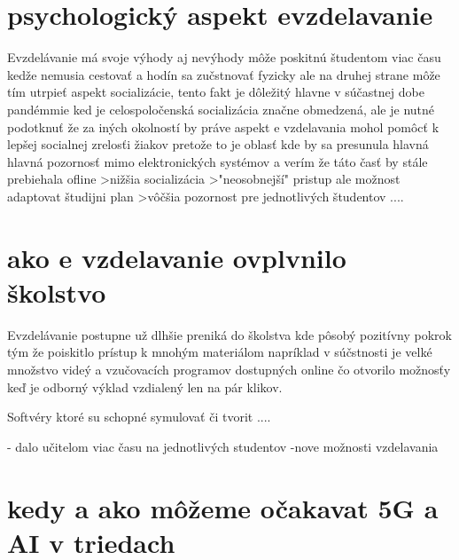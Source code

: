 \documentclass[10pt,oneside,slovak,a4paper]{article}
\begin{document}


\section{psychologický aspekt evzdelavanie }
Evzdelávanie má svoje výhody aj nevýhody môže poskitnú študentom viac času kedže nemusia cestovať a hodín sa zučstnovať fyzicky ale na druhej strane môže tím utrpieť aspekt socializácie, tento fakt je dôležitý hlavne v súčastnej dobe pandémmie ked je celospoločenská socializácia značne obmedzená, ale je nutné podotknuť že za iných okolností by práve aspekt e vzdelavania mohol pomôcť k lepšej socialnej zrelosťi žiakov pretože to je oblasť kde by sa presunula hlavná hlavná pozornosť mimo elektronických systémov a verím že táto časť by stále prebiehala ofline 
>nižšia socializácia 
>"neosobnejší" pristup ale možnost adaptovat študijni plan 
>vôčšia pozornost pre jednotlivých študentov ....

\section{ako e vzdelavanie ovplvnilo školstvo}
Evzdelávanie postupne už dlhšie preniká do školstva kde pôsobý pozitívny pokrok tým že poiskitlo prístup k mnohým materiálom napríklad v súčstnosti je velké množstvo videý a vzučovacích programov dostupných online čo otvorilo možnosťy keď je odborný výklad vzdialený len na pár klikov. 

Softvéry ktoré su schopné symulovať či tvorit ....\cite{10.1145/3399971.3399984}


- dalo učitelom viac času na jednotlivých studentov 
-nove možnosti vzdelavania 

\section{kedy a ako môžeme očakavat 5G a AI v triedach}





	

	
	
\end{document}
